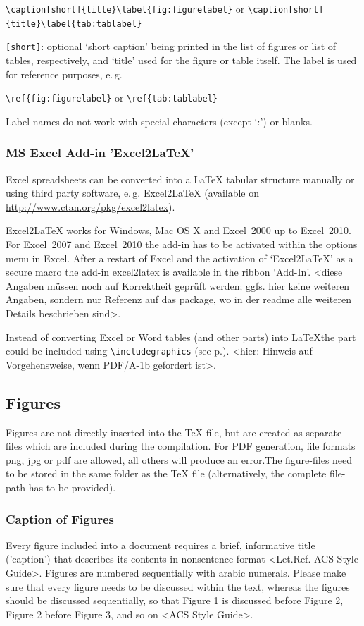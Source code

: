 \documentclass{pharmrep}
\newcommand{\eg}{e.\,g.\xspace}
\begin{document}
\verb|\caption[short]{title}\label{fig:figurelabel}| or \newline
\verb|\caption[short]{title}\label{tab:tablabel}|

\verb|[short]|: optional `short caption' being printed in the list of figures or list of tables, respectively,
and `title' used for the figure or table itself. The label is used for reference purposes, \eg

\verb|\ref{fig:figurelabel}| or \verb|\ref{tab:tablabel}|

Label names do not work with special characters (except `:') or blanks.

\subsubsection{MS Excel Add-in 'Excel2LaTeX'}
Excel spreadsheets can be converted into a \LaTeX{} tabular structure manually or using third party
software, \eg Excel2LaTeX (available on \url{http://www.ctan.org/pkg/excel2latex}).

Excel2LaTeX works for Windows, Mac OS X and Excel~2000 up to Excel~2010. For Excel~2007 and
Excel~2010 the add-in has to be activated within the options menu in Excel. After a restart of Excel and
the
activation of `Excel2LaTeX' as a secure macro the add-in excel2latex is available in the ribbon `Add-In'.
<diese Angaben müssen noch auf Korrektheit geprüft werden; ggfs. hier keine weiteren Angaben,
sondern nur Referenz auf das package, wo in der readme alle weiteren Details beschrieben sind>.

Instead of converting Excel or Word tables (and other parts) into \LaTeX the part could be included using
\verb|\includegraphics| (see p.\pageref{sec:includepdfs}). <hier: Hinweis auf Vorgehensweise, wenn
PDF/A-1b gefordert ist>.

\newpage
\subsection{Figures}
Figures are not directly inserted into the \TeX{} file, but are created as separate files which are included
during the compilation. For PDF generation, file formats png, jpg or pdf are allowed, all others will
produce an error.The figure-files need to be stored in the same folder as the \TeX{} file (alternatively, the complete
file-path has to be provided).

\subsubsection{Caption of Figures}
Every figure included into a document requires a brief, informative title ('caption') that describes its
contents in nonsentence format <Let.Ref. ACS Style Guide>.  Figures are numbered sequentially with
arabic
numerals.
Please make sure that every figure needs to be discussed within the text, whereas the figures should be
discussed sequentially, so that Figure 1 is discussed before Figure 2, Figure 2 before Figure 3, and so on
<ACS Style Guide>.
\end{document}
